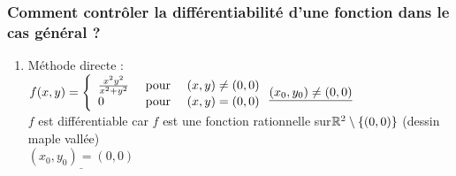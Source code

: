 \documentclass[12pt,a4paper]{article}
\begin{document}
\subsubsection*{Comment contrôler la différentiabilité d'une fonction dans le cas général ?}
\begin{enumerate}[label=\Alph*.]
	\item Méthode directe :\\
	$f(x,y) = \left\{ \begin{array}{lll}
		\frac{x^2y^2}{x^2+y^2} & \mbox{ pour } & (x,y) \neq (0,0)\\
		0 & \mbox{ pour } & (x,y) = (0,0)
	\end{array}\right.\\
	\underline{(x_0,y_0) \neq (0,0)}$\\
	$f$ est différentiable car $f$ est une fonction rationnelle sur$\mathbb{R}^2 \setminus \{(0,0)\}$ (dessin maple vallée)\\
	$\underline{(x_0,y_0) = (0,0)}$\\
	

\end{enumerate}
\end{document}
